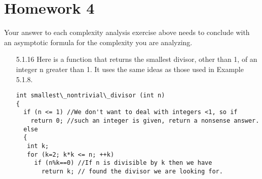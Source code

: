 \section{Homework 4}


Your answer to each complexity analysis exercise above needs to conclude with an asymptotic formula for the complexity you are analyzing.

\begin{enumerate}
\item [5.1.16] Here is a function that returns the smallest divisor, other than 1, of an integer n greater than 1. It uses the same ideas as those used in Example 5.1.8. \\
\begin{lstlisting}
int smallest\_nontrivial\_divisor (int n)
{
  if (n <= 1) //We don't want to deal with integers <1, so if
    return 0; //such an integer is given, return a nonsense answer.
  else
  {
   int k;
   for (k=2; k*k <= n; ++k)
     if (n%k==0) //If n is divisible by k then we have
       return k; // found the divisor we are looking for.


\end{lstlisting}
\end{enumerate}
